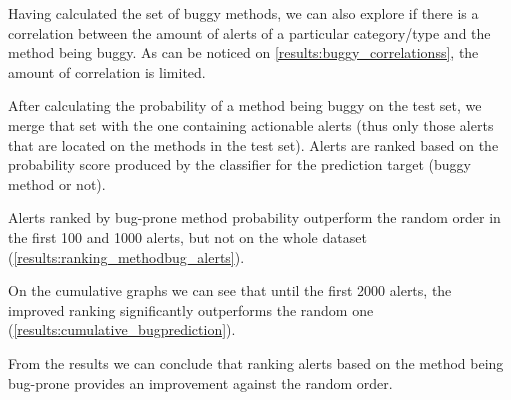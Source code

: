 Having calculated the set of buggy methods, we can also explore if there is a correlation between the amount of alerts of a particular category/type and the method being buggy. As can be noticed on \cref{results:buggy_correlationss}, the amount of correlation is limited. 

After calculating the probability of a method being buggy on the test set, we merge that set with the one containing actionable alerts (thus only those alerts that are located on the methods in the test set). Alerts are ranked based on the probability score produced by the classifier for the prediction target (buggy method or not). %

Alerts ranked by bug-prone method probability outperform the random order in the first 100 and 1000 alerts, but not on the whole dataset (\cref{results:ranking_methodbug_alerts}).

On the cumulative graphs we can see that until the first 2000 alerts, the improved ranking significantly outperforms the random one (\cref{results:cumulative_bugprediction}).

From the results we can conclude that ranking alerts based on the method being bug-prone provides an improvement against the random order. 

